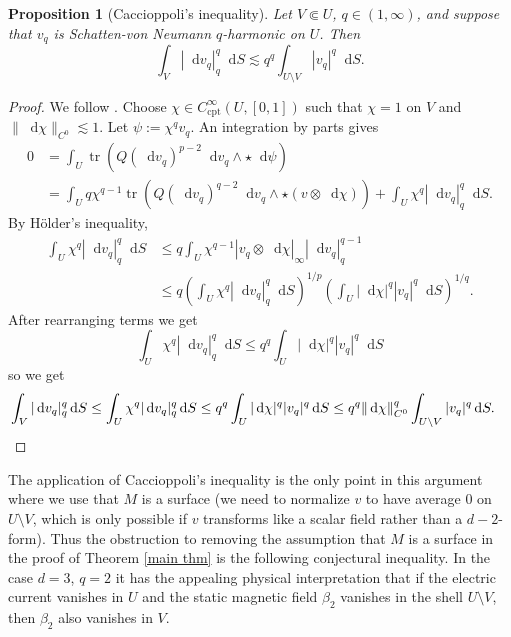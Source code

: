\documentclass[reqno,11pt]{amsart}
\newcommand*\dif{\mathop{}\!\mathrm{d}}
\DeclareMathOperator{\tr}{tr}
\newcommand{\cpt}{\mathrm{cpt}}
\newtheorem{proposition}[theorem]{Proposition}
\theoremstyle{definition}
\numberwithin{equation}{section}
\begin{document}
\begin{proposition}[Caccioppoli's inequality]\label{Caccioppoli}
Let $V \Subset U$, $q \in (1, \infty)$, and suppose that $v_q$ is Schatten-von Neumann $q$-harmonic on $U$.
Then
$$\int_V |\dif v_q|_{q}^q \dif S \lesssim q^q \int_{U \setminus V} |v_q|^q \dif S.$$
\end{proposition}
\begin{proof}
We follow \cite[Theorem 11.20]{kinnunen2021maximal}.
Choose $\chi \in C^\infty_\cpt(U, [0, 1])$ such that $\chi = 1$ on $V$ and $\|\dif \chi\|_{C^0} \lesssim 1$.
Let $\psi := \chi^q v_q$.
An integration by parts gives
\begin{align*}
0 &= \int_U \tr(Q(\dif v_q)^{p - 2} \dif v_q \wedge \star \dif \psi) \\
&= \int_U q\chi^{q - 1} \tr(Q(\dif v_q)^{q - 2} \dif v_q \wedge \star (v \otimes \dif \chi)) + \int_U \chi^q |\dif v_q|_{q}^q \dif S.
\end{align*}
By H\"older's inequality,
\begin{align*}
\int_U \chi^q |\dif v_q|_{q}^q \dif S
&\leq q \int_U \chi^{q - 1} |v_q \otimes \dif \chi|_{\infty} |\dif v_q|_{q}^{q - 1} \\
&\leq q \left(\int_U \chi^q |\dif v_q|_{q}^q \dif S\right)^{1/p} \left(\int_U |\dif \chi|^q |v_q|^q \dif S\right)^{1/q}.
\end{align*}
After rearranging terms we get 
$$\int_U \chi^q |\dif v_q|_{q}^q \dif S \leq q^q \int_U |\dif \chi|^q |v_q|^q \dif S$$
so we get 
\begin{align*}
\int_V |\dif v_q|_{q}^q \dif S &\leq \int_U \chi^q |\dif v_q|_{q}^q \dif S \leq q^q \int_U |\dif \chi|^q |v_q|^q \dif S
\leq q^q \|\dif \chi\|_{C^0}^q \int_{U \setminus V} |v_q|^q \dif S. \qedhere 
\end{align*}
\end{proof}

The application of Caccioppoli's inequality is the only point in this argument where we use that $M$ is a surface (we need to normalize $v$ to have average $0$ on $U \setminus V$, which is only possible if $v$ transforms like a scalar field rather than a $d - 2$-form).
Thus the obstruction to removing the assumption that $M$ is a surface in the proof of Theorem \ref{main thm} is the following conjectural inequality.
In the case $d = 3$, $q = 2$ it has the appealing physical interpretation that if the electric current vanishes in $U$ and the static magnetic field $\beta_2$ vanishes in the shell $U \setminus V$, then $\beta_2$ also vanishes in $V$.
\end{document}
